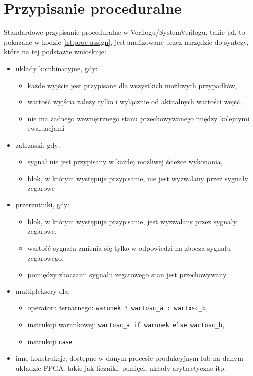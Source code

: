 \documentclass[shortabstract, inz]{iithesis}
\newcounter{kod}[chapter]
\begin{document}
\section{Przypisanie proceduralne}
Standardowe przypisanie proceduralne w Verilogu/SystemVerilogu, takie jak to pokazane w kodzie \ref{lst:proc-assign}, jest analizowane przez narzędzie do syntezy, które na tej podstawie wnioskuje:
\begin{itemize}
    \item układy kombinacyjne, gdy:
    \begin{itemize}
        \item każde wyjście jest przypisane dla wszystkich możliwych przypadków,
        \item wartość wyjścia zależy tylko i wyłącznie od aktualnych wartości wejść,
        \item nie ma żadnego wewnętrznego stanu przechowywanego między kolejnymi ewaluacjami
    \end{itemize}
    \item zatrzaski, gdy:
    \begin{itemize}
        \item sygnał nie jest przypisany w każdej możliwej ścieżce wykonania,
        \item blok, w którym występuje przypisanie, nie jest wyzwalany przez sygnały zegarowe
    \end{itemize}
    \item przerzutniki, gdy:
    \begin{itemize}
        \item blok, w którym występuje przypisanie, jest wyzwalany przez sygnały zegarowe,
        \item wartość sygnału zmienia się tylko w odpowiedzi na zbocza sygnału zegarowego,
        \item pomiędzy zboczami sygnału zegarowego stan jest przechowywany
    \end{itemize}
    \item multipleksery dla:
    \begin{itemize}
        \item operatora ternarnego: \texttt{warunek ? wartosc\_a : wartosc\_b},
        \item instrukcji warunkowej: \texttt{wartosc\_a if warunek else wartosc\_b},
        \item instrukcji \texttt{case}
    \end{itemize}
    \item inne konstrukcje, dostępne w danym procesie produkcyjnym lub na danym układzie FPGA, takie jak liczniki, pamięci, układy arytmetyczne itp.
\end{itemize}
\end{document}
